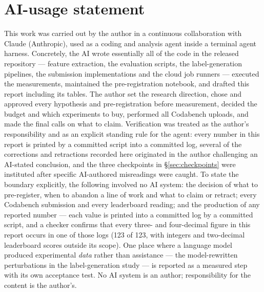 \documentclass[10pt]{article}
\begin{document}
\section*{AI-usage statement}
This work was carried out by the author in a continuous collaboration with Claude (Anthropic),
used as a coding and analysis agent inside a terminal agent harness. Concretely, the AI wrote
essentially all of the code in the released repository --- feature extraction, the evaluation
scripts, the label-generation pipelines, the submission implementations and the cloud job runners ---
executed the measurements, maintained the pre-registration notebook, and drafted this report
including its tables. The author set the research direction, chose and approved every hypothesis and
pre-registration before measurement, decided the budget and which experiments to buy, performed all
Codabench uploads, and made the final calls on what to claim. Verification was treated as the
author's responsibility and as an explicit standing rule for the agent: every number in this report
is printed by a committed script into a committed log, several of the corrections and retractions
recorded here originated in the author challenging an AI-stated conclusion, and the three
checkpoints in \S\ref{sec:checkpoints} were instituted after specific AI-authored misreadings were
caught. To state the boundary explicitly, the following involved no AI system: the decision of what to
pre-register, when to abandon a line of work and what to claim or retract; every Codabench
submission and every leaderboard reading; and the production of any reported number --- each
value is printed into a committed log by a committed script, and a checker confirms that every
three- and four-decimal figure in this report occurs in one of those logs (123 of 123, with
integers and two-decimal leaderboard scores outside its scope). One place where a language model
produced experimental \emph{data} rather than assistance --- the model-rewritten perturbations
in the label-generation study --- is reported as a measured step with its own acceptance test. No AI system is an author; responsibility for the content is the author's.
\end{document}
